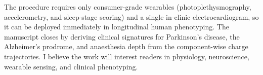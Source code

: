The procedure requires only consumer-grade wearables (photoplethysmography, accelerometry, and sleep-stage scoring) and a single in-clinic electrocardiogram, so it can be deployed immediately in longitudinal human phenotyping. The manuscript closes by deriving clinical signatures for Parkinson's disease, the Alzheimer's prodrome, and anaesthesia depth from the component-wise charge trajectories. I believe the work will interest readers in physiology, neuroscience, wearable sensing, and clinical phenotyping.

\declarations

\signoff

